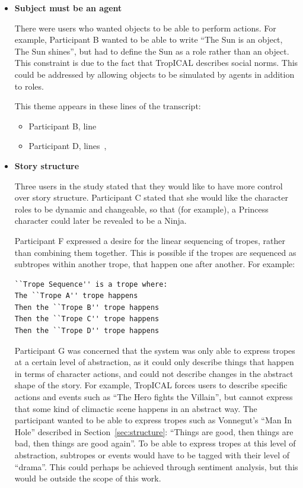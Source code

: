 \documentclass[11pt]{report}
\begin{document}
\begin{itemize}
\item \textbf{Subject must be an agent}

  There were users who wanted objects to be able to perform actions. For
  example, Participant B wanted to be able to write ``The Sun is an object, The
  Sun shines'', but had to define the Sun as a role rather than an object. This
  constraint is due to the fact that TropICAL describes social
  norms. This could be addressed by allowing objects to be simulated by agents in addition to roles.
  
This theme appears in these lines of the transcript:

\begin{itemize}
\item Participant B, line~
\item Participant D, lines~,~
\end{itemize}


\item \textbf{Story structure}

Three users in the study stated that they would like to have more control over
story structure. Participant C stated that she would like the character roles to
be dynamic and changeable, so that (for example), a Princess character could
later be revealed to be a Ninja.

Participant F expressed a desire for the linear sequencing of tropes, rather
than combining them together. This is possible if the tropes are sequenced as
subtropes within another trope, that happen one after another. For example:

\begin{verbatim}
``Trope Sequence'' is a trope where:
The ``Trope A'' trope happens
Then the ``Trope B'' trope happens
Then the ``Trope C'' trope happens
Then the ``Trope D'' trope happens
\end{verbatim}

Participant G was concerned that the system was only able to express tropes at a
certain level of abstraction, as it could only describe things that happen in
terms of character actions, and could not describe changes in the abstract shape of the
story. For example, TropICAL forces users to describe specific actions and
events such as ``The Hero fights the Villain'', but cannot express that some
kind of climactic scene happens in an abstract way. The participant wanted to be
able to express tropes such as Vonnegut's ``Man In Hole'' described in
Section~\ref{sec:structure}: ``Things are good, then things are bad, then things
are good again''. To be able to express tropes at this level of abstraction,
subtropes or events would have to be tagged with their level of ``drama''. This
could perhaps be achieved through sentiment analysis, but this would be outside
the scope of this work.


\end{itemize}
\end{document}
